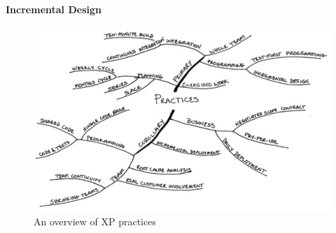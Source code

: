 \documentclass[conference]{IEEEtran}
\begin{document}
\paragraph{Incremental Design}

\begin{figure}
\centering
\includegraphics[width=\linewidth]{xp_practices.png}
\caption{An overview of XP practices \cite{Beck:2004tc}}
\label{fig:xp_pract}
\end{figure}

%
%

\end{document}
